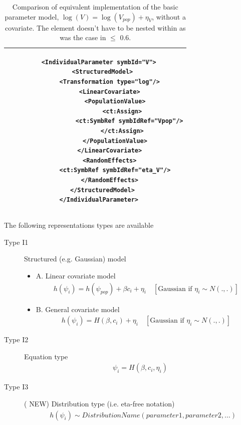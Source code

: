\begin{itemize}
\begin{table}[ht!]
\begin{center}
\begin{tabular}{cc}
&
\lstset{language=XML}
\begin{lstlisting}
<IndividualParameter symbId="V">
  <StructuredModel>
      <Transformation type="log"/>
      <LinearCovariate>
         <PopulationValue>
             <ct:Assign>
                 <ct:SymbRef symbIdRef="Vpop"/>
             </ct:Assign>
         </PopulationValue>
      </LinearCovariate>
      <RandomEffects>
         <ct:SymbRef symbIdRef="eta_V"/>
      </RandomEffects>
  </StructuredModel>
</IndividualParameter>
\end{lstlisting}  \\
  \hline
  \end{tabular}
\vspace{-1.5em}
\caption{Comparison of equivalent implementation of the basic parameter model,
$\log(V) = \log(V_{pop}) + \eta_V$, without a covariate. The element 
doesn't have to be nested within  as was the case in $\leq$ 0.6.}
\label{tab:missingCovariateModel}
\end{center}
\end{table}

\end{itemize}
The following representations types are available 
\begin{description} 
\item[Type I1]  Structured (e.g. Gaussian) model 
\begin{itemize}
\item
	A.  Linear covariate model
\begin{align*}
         	h(\psi_i) = h(\psi_{pop}) + \beta c_i + \eta_i \quad [\text{Gaussian if } \eta_i \sim N(.,.)]
 \end{align*}
               
\item
	B. General covariate model
\begin{align*}
        	h(\psi_i) = H(\beta, c_i) + \eta_i  \quad [\text{Gaussian if } \eta_i \sim N(.,.)]
\end{align*}
\end{itemize}
\item[Type I2] Equation type
\begin{align*}
       		\psi_i = H(\beta, c_i, \eta_i)
\end{align*}    
\item[Type I3] ({\color{red} \scshape{NEW}}) Distribution type (i.e. eta-free notation)
\begin{align*}
		& h(\psi_i) \sim DistributionName(parameter1, parameter2, \dots)
\end{align*}
\end{description}

